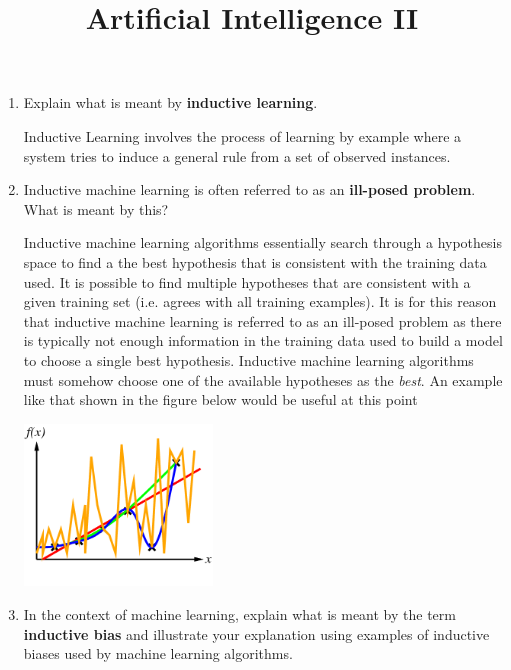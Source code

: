 \documentclass[--SOLUTION-OPTION--]{ditpaper}
\title{Artificial Intelligence II}
\begin{document}

\question
\begin{enumerate}
	\item Explain what is meant by \textbf{inductive learning}.
	\begin{answer}
		Inductive Learning involves the process of learning by example where a system tries to induce a general rule from a set of observed instances.
	\end{answer}
		\item  Inductive machine learning is often referred to as an \textbf{ill-posed problem}. What is meant by this?
	\begin{answer}
		Inductive machine learning algorithms essentially search through a hypothesis space to find a the best hypothesis that is consistent with the training data used. It is possible to find multiple hypotheses that are  consistent with a given training set (i.e. agrees with all training examples).  It is for this reason that inductive machine learning is referred to as an ill-posed problem as there is typically not enough information in the training data used to build a model to choose a single best hypothesis. Inductive machine learning algorithms must somehow choose one of the available hypotheses as the \emph{best}. An example like that shown in the figure below would be useful at this point
		\begin{center}
			\includegraphics[width=5cm]{./images/curve-fitting5.png}
		\end{center}
	\end{answer}
	\item  In the context of machine learning, explain what is meant by the term \textbf{inductive bias} and illustrate your explanation using examples of inductive biases used by machine learning algorithms.
	\begin{answer}

\end{answer}
\end{enumerate}
\end{document}
